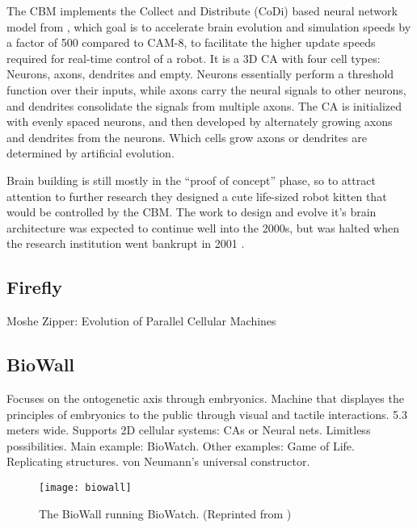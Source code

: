 The CBM implements the Collect and Distribute (CoDi) based neural network model from \cite{gers1998codi}, which goal is to accelerate brain evolution and simulation speeds by a factor of 500 compared to CAM-8, to facilitate the higher update speeds required for real-time control of a robot.
It is a 3D CA with four cell types: Neurons, axons, dendrites and empty.
Neurons essentially perform a threshold function over their inputs, while axons carry the neural signals to other neurons, and dendrites consolidate the signals from multiple axons.
The CA is initialized with evenly spaced neurons, and then developed by alternately growing axons and dendrites from the neurons.
Which cells grow axons or dendrites are determined by artificial evolution.

Brain building is still mostly in the ``proof of concept'' phase, so to attract attention to further research they designed a cute life-sized robot kitten that would be controlled by the CBM.
The work to design and evolve it's brain architecture was expected to continue well into the 2000s, but was halted when the research institution went bankrupt in 2001 \cite{giles2001utopian}.

\subsection{Firefly}

\TODO
Moshe Zipper: Evolution of Parallel Cellular Machines

\subsection{BioWall}

\TODO
Focuses on the ontogenetic axis through embryonics.
Machine that displayes the principles of embryonics to the public through visual and tactile interactions.
5.3 meters wide.
Supports 2D cellular systems: CAs or Neural nets.
Limitless possibilities.
Main example:
BioWatch.
Other examples:
Game of Life.
Replicating structures.
von Neumann's universal constructor.

\begin{figure}[!ht]
    \centering
    \texttt{[image: biowall]}
    \caption[BioWall]{
        The BioWall running BioWatch.
        (Reprinted from \cite{tempesti2002biowall})
    }
    \label{fig:biowall}
\end{figure}
